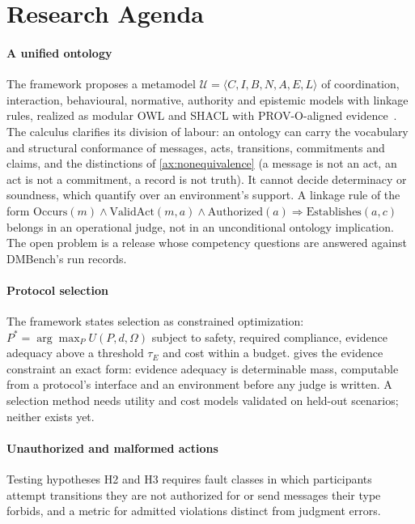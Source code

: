 \section{Research Agenda}
\label{sec:agenda}

\paragraph{A unified ontology} The framework proposes a metamodel $\mathcal{U} = \langle C, I, B, N, A, E, L \rangle$ of coordination, interaction, behavioural, normative, authority and epistemic models with linkage rules, realized as modular OWL and SHACL with PROV-O-aligned evidence~\cite{w3c2013provo}. The calculus clarifies its division of labour: an ontology can carry the vocabulary and structural conformance of messages, acts, transitions, commitments and claims, and the distinctions of \cref{ax:nonequivalence} (a message is not an act, an act is not a commitment, a record is not truth). It cannot decide determinacy or soundness, which quantify over an environment's support. A linkage rule of the form $\mathrm{Occurs}(m) \wedge \mathrm{ValidAct}(m, a) \wedge \mathrm{Authorized}(a) \Rightarrow \mathrm{Establishes}(a, c)$ belongs in an operational judge, not in an unconditional ontology implication. The open problem is a release whose competency questions are answered against DMBench's run records.

\paragraph{Protocol selection} The framework states selection as constrained optimization: $P^\ast = \arg\max_{P} U(P, d, \Omega)$ subject to safety, required compliance, evidence adequacy above a threshold $\tau_E$ and cost within a budget.  gives the evidence constraint an exact form: evidence adequacy is determinable mass, computable from a protocol's interface and an environment before any judge is written. A selection method needs utility and cost models validated on held-out scenarios; neither exists yet.

\paragraph{Unauthorized and malformed actions} Testing hypotheses H2 and H3 requires fault classes in which participants attempt transitions they are not authorized for or send messages their type forbids, and a metric for admitted violations distinct from judgment errors.

